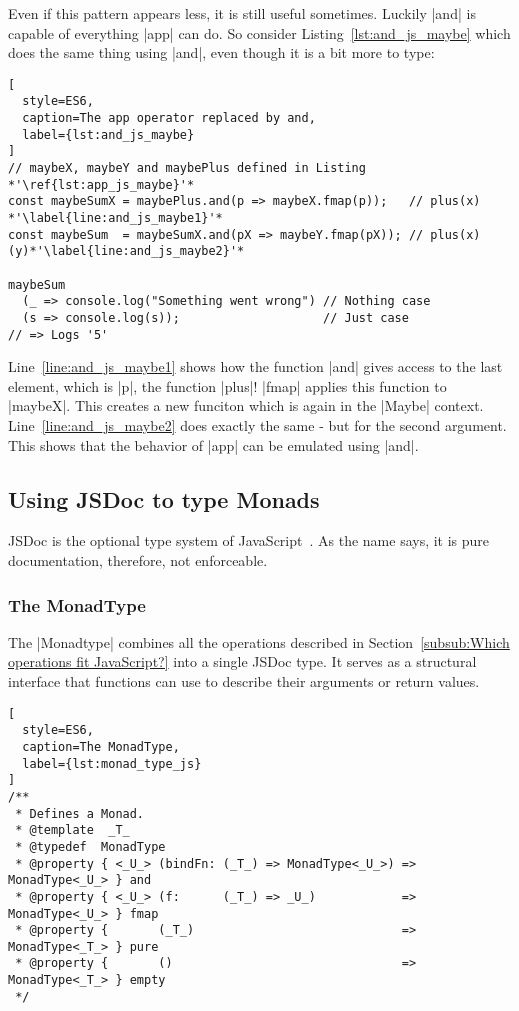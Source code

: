 Even if this pattern appears less, it is still useful sometimes. Luckily |and|
is capable of everything |app| can do. So consider
Listing~\ref{lst:and_js_maybe} which does the same thing using |and|, even
though it is a bit more to type:

\begin{lstlisting}[
  style=ES6,
  caption=The app operator replaced by and,
  label={lst:and_js_maybe}
]
// maybeX, maybeY and maybePlus defined in Listing    *'\ref{lst:app_js_maybe}'*
const maybeSumX = maybePlus.and(p => maybeX.fmap(p));   // plus(x) *'\label{line:and_js_maybe1}'*
const maybeSum  = maybeSumX.and(pX => maybeY.fmap(pX)); // plus(x)(y)*'\label{line:and_js_maybe2}'*

maybeSum 
  (_ => console.log("Something went wrong") // Nothing case
  (s => console.log(s));                    // Just case
// => Logs '5'
\end{lstlisting}

Line~\ref{line:and_js_maybe1} shows how the function |and| gives access to the
last element, which is |p|, the function |plus|! |fmap| applies this function
to |maybeX|. This creates a new funciton which is again in the |Maybe|
context. Line~\ref{line:and_js_maybe2} does exactly the same - but for the second
argument. \\ 
This shows that the behavior of |app| can be emulated using |and|.

\subsection{Using JSDoc to type Monads} %
\label{sub:Using JSDoc to type monads}
JSDoc is the optional type system of JavaScript~\cite{jsdoc_use_2023}. As the
name says, it is pure documentation, therefore, not enforceable.

\subsubsection{The MonadType} %
\label{subsub:The MonadType}
The |Monadtype| combines all the operations described in
Section~\ref{subsub:Which operations fit JavaScript?} into a single JSDoc type.
It serves as a structural interface that functions can use to describe their
arguments or return values.

\begin{lstlisting}[
  style=ES6,
  caption=The MonadType,
  label={lst:monad_type_js}
]
/**
 * Defines a Monad.
 * @template  _T_
 * @typedef  MonadType
 * @property { <_U_> (bindFn: (_T_) => MonadType<_U_>) => MonadType<_U_> } and
 * @property { <_U_> (f:      (_T_) => _U_)            => MonadType<_U_> } fmap
 * @property {       (_T_)                             => MonadType<_T_> } pure
 * @property {       ()                                => MonadType<_T_> } empty
 */
\end{lstlisting}

